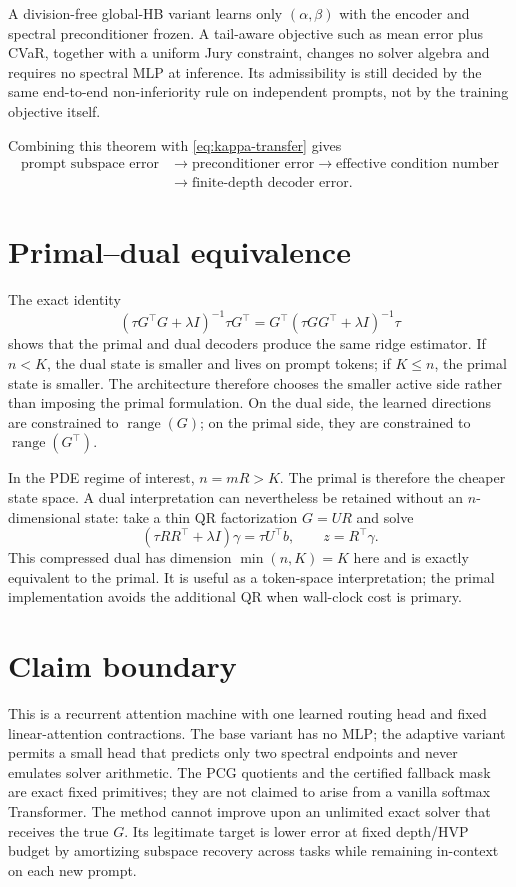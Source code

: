 \documentclass[11pt]{article}
\newcommand{\range}{\operatorname{range}}
\begin{document}
A division-free global-HB variant learns only $(\alpha,\beta)$ with the
encoder and spectral preconditioner frozen.  A tail-aware objective such as
mean error plus CVaR, together with a uniform Jury constraint, changes no
solver algebra and requires no spectral MLP at inference.  Its admissibility
is still decided by the same end-to-end non-inferiority rule on independent
prompts, not by the training objective itself.

Combining this theorem with \eqref{eq:kappa-transfer} gives
\begin{align*}
 \text{prompt subspace error}
 &\longrightarrow \text{preconditioner error}
 \longrightarrow \text{effective condition number}\\
 &\longrightarrow \text{finite-depth decoder error}.
\end{align*}

\section{Primal--dual equivalence}

The exact identity
\[
 (\tau G^\top G+\lambda I)^{-1}\tau G^\top
 =G^\top(\tau GG^\top+\lambda I)^{-1}\tau
\]
shows that the primal and dual decoders produce the same ridge estimator.  If
$n<K$, the dual state is smaller and lives on prompt tokens; if $K\leq n$, the
primal state is smaller.  The architecture therefore chooses the smaller
active side rather than imposing the primal formulation.  On the dual side,
the learned directions are constrained to $\range(G)$; on the primal side,
they are constrained to $\range(G^\top)$.

In the PDE regime of interest, $n=mR>K$.  The primal is therefore the cheaper
state space.  A dual interpretation can nevertheless be retained without an
$n$-dimensional state: take a thin QR factorization $G=UR$ and solve
\[
 (\tau RR^\top+\lambda I)\gamma=\tau U^\top b,
 \qquad z=R^\top\gamma.
\]
This compressed dual has dimension $\min(n,K)=K$ here and is exactly equivalent
to the primal.  It is useful as a token-space interpretation; the primal
implementation avoids the additional QR when wall-clock cost is primary.

\section{Claim boundary}

This is a recurrent attention machine with one learned routing head and fixed
linear-attention contractions.  The base variant has no MLP; the adaptive
variant permits a small head that predicts only two spectral endpoints and
never emulates solver arithmetic.  The PCG quotients and the certified
fallback mask are exact fixed primitives; they are not claimed to arise from
a vanilla softmax Transformer.
The method cannot improve upon an unlimited exact solver that receives the
true $G$.  Its legitimate target is lower error at fixed depth/HVP budget by
amortizing subspace recovery across tasks while remaining in-context on each
new prompt.
\end{document}
